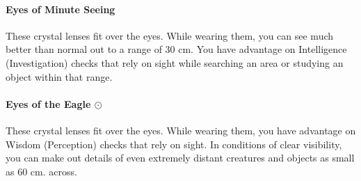     \paragraph{Eyes of Minute Seeing}
        These crystal lenses fit over the eyes.
        While wearing them, you can see much better than normal out to a range of 30 cm.
        You have advantage on Intelligence (Investigation) checks that rely on sight while searching an area or studying an object within that range.
    \paragraph{Eyes of the Eagle $\odot$}
        These crystal lenses fit over the eyes.
        While wearing them, you have advantage on Wisdom (Perception) checks that rely on sight.
        In conditions of clear visibility, you can make out details of even extremely distant creatures and objects as small as 60 cm. across.
